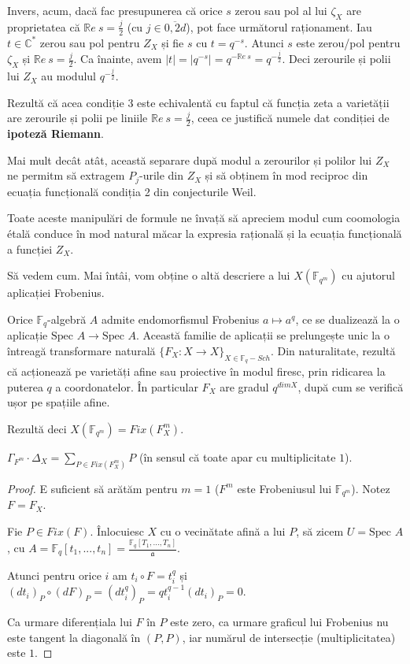 \documentclass[13pt,openany]{book}
\begin{document}
Invers, acum, dacă fac presupunerea că orice $s$ zerou sau pol al lui $\zeta_X$ are proprietatea că $\mathbb{R}e\ s=\frac{j}{2}$ (cu $j\in\overline{0,2d}$), pot face următorul raționament. Iau $t \in \mathbb{C}^*$ zerou sau pol pentru $Z_X$ și fie $s$ cu $t=q^{-s}$. Atunci $s$ este zerou/pol pentru $\zeta_X$ și $\mathbb{R}e\ s=\frac{j}{2}$. Ca înainte, avem $\mid t\mid =\mid q^{-s}\mid =q^{-\mathbb{R}e\ s}=q^{-\frac{j}{2}}$. Deci zerourile și polii lui $Z_X$ au modulul $q^{-\frac{j}{2}}$.

Rezultă că acea condiție 3 este echivalentă cu faptul că funcția zeta a varietății are zerourile și polii pe liniile $\mathbb{R}e\ s=\frac{j}{2}$, ceea ce justifică numele dat condiției de {\bf ipoteză Riemann}.

Mai mult decât atât, această separare după modul a zerourilor și polilor lui $Z_X$ ne permitm să extragem $P_j$-urile din $Z_X$ și să obținem în mod reciproc din ecuația funcțională condiția 2 din conjecturile Weil.

Toate aceste manipulări de formule ne învață să apreciem modul cum coomologia étală conduce în mod natural măcar la expresia rațională și la ecuația funcțională a funcției $Z_X$.

Să vedem cum. Mai întâi, vom obține o altă descriere a lui $X(\mathbb{F}_{q^m})$ cu ajutorul aplicației Frobenius.

Orice $\mathbb{F}_q$-algebră $A$ admite endomorfismul Frobenius $a \mapsto a^q$, ce se dualizează la o aplicație $\text{Spec } A \rightarrow \text{Spec } A$. Această familie de aplicații se prelungește unic la o întreagă transformare naturală $\{F_X : X \rightarrow X\}_{X \in \mathbb{F}_q-Sch}$. Din naturalitate, rezultă că acționează pe varietăți afine sau proiective în modul firesc, prin ridicarea la puterea $q$ a coordonatelor. În particular $F_X$ are gradul $q^{dim X}$, după cum se verifică ușor pe spațiile afine.

Rezultă deci  $X(\mathbb{F}_{q^m})=Fix(F_X^m)$.

\begin{lema}
$\Gamma_{F^m} \cdot \Delta_X = \sum\limits_{P \in Fix(F_X^m)} P$ (în sensul că toate apar cu multiplicitate $1$).
\end{lema}

\begin{proof}
E suficient să arătăm pentru $m=1$ ($F^m$ este Frobeniusul lui $\mathbb{F}_{q^m}$). Notez $F=F_X$.

Fie $P\in Fix(F)$. Înlocuiesc $X$ cu o vecinătate afină a lui $P$, să zicem $U=\text{Spec }A$, cu $A=\mathbb{F}_q[t_1,...,t_n]=\frac{\mathbb{F}_q[T_1,...,T_n]}{\mathfrak{a}}$.

Atunci pentru orice $i$ am $t_i \circ F = t_i^q$ și $(dt_i)_P \circ (dF)_P = (dt_i^q)_P = qt_i^{q-1}(dt_i)_P = 0$.

Ca urmare diferențiala lui $F$ în $P$ este zero, ca urmare graficul lui Frobenius nu este tangent la diagonală în $(P,P)$, iar numărul de intersecție (multiplicitatea) este $1$. 
\end{proof}
\end{document}
